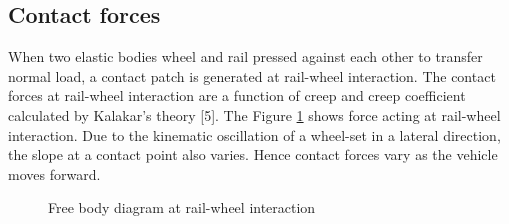 \documentclass[]{interact}
\theoremstyle{plain}%
\theoremstyle{definition}
\theoremstyle{remark}
\begin{document}
\subsection{Contact forces}
When two elastic bodies wheel and rail pressed against each other to transfer normal load, a contact patch is generated at rail-wheel interaction. The contact forces at rail-wheel interaction are a function of creep and creep coefficient calculated by Kalakar’s theory [5]. The Figure  \ref{fig:FBD} shows force acting at rail-wheel interaction. Due to the kinematic oscillation of a wheel-set in a lateral direction, the slope at a contact point also varies. Hence contact forces vary as the vehicle moves forward.

\begin{figure}[h]
\centering
{}\label{fig:forceonrail}
\label{fig:crosssection}
\caption{Free body diagram at rail-wheel interaction} \label{fig:FBD}
\end{figure}
\end{document}
